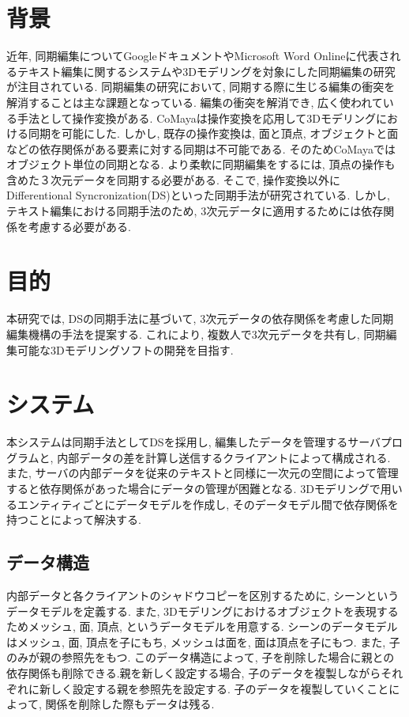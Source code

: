 \documentclass{AIabst}
\begin{document}
\makeAbstHeader
%
%
%
\section{背景}
	近年, 同期編集についてGoogleドキュメントやMicrosoft Word Onlineに代表されるテキスト編集に関するシステムや3Dモデリングを対象にした同期編集の研究が注目されている.
	同期編集の研究において, 同期する際に生じる編集の衝突を解消することは主な課題となっている.
	編集の衝突を解消でき, 広く使われている手法として操作変換がある.
	CoMaya\cite{COMAYA}は操作変換を応用して3Dモデリングにおける同期を可能にした.
	しかし, 既存の操作変換は, 面と頂点, オブジェクトと面などの依存関係がある要素に対する同期は不可能である.
	そのためCoMayaではオブジェクト単位の同期となる.
	より柔軟に同期編集をするには, 頂点の操作も含めた３次元データを同期する必要がある.
	そこで, 操作変換以外にDifferentional Syncronization(DS)\cite{DS}といった同期手法が研究されている.
	しかし, テキスト編集における同期手法のため, 3次元データに適用するためには依存関係を考慮する必要がある.

\section{目的}
 本研究では, DSの同期手法に基づいて, 3次元データの依存関係を考慮した同期編集機構の手法を提案する.
  これにより, 複数人で3次元データを共有し, 同期編集可能な3Dモデリングソフトの開発を目指す.
\section{システム}
 本システムは同期手法としてDSを採用し, 編集したデータを管理するサーバプログラムと, 内部データの差を計算し送信するクライアントによって構成される.
  また, サーバの内部データを従来のテキストと同様に一次元の空間によって管理すると依存関係があった場合にデータの管理が困難となる.
  3Dモデリングで用いるエンティティごとにデータモデルを作成し, そのデータモデル間で依存関係を持つことによって解決する.
  \subsection{データ構造}
  内部データと各クライアントのシャドウコピーを区別するために, シーンというデータモデルを定義する.
  また, 3Dモデリングにおけるオブジェクトを表現するためメッシュ, 面, 頂点, というデータモデルを用意する.
  シーンのデータモデルはメッシュ, 面, 頂点を子にもち, メッシュは面を, 面は頂点を子にもつ. また, 子のみが親の参照先をもつ. このデータ構造によって, 子を削除した場合に親との依存関係も削除できる.親を新しく設定する場合, 子のデータを複製しながらそれぞれに新しく設定する親を参照先を設定する. 子のデータを複製していくことによって, 関係を削除した際もデータは残る.
\end{document}

